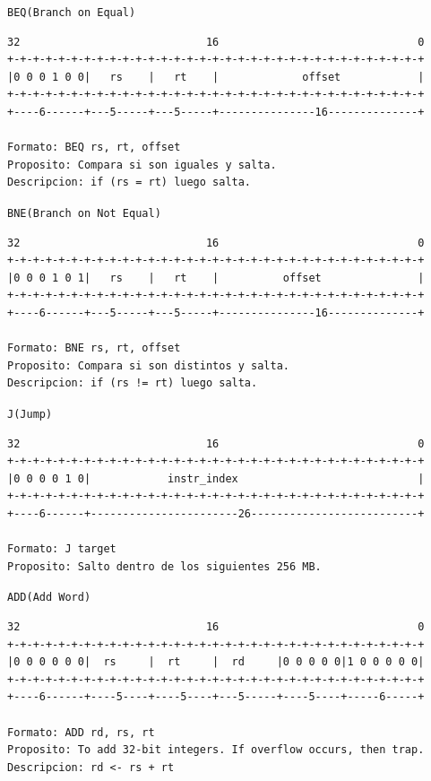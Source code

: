 \texttt{BEQ(Branch on Equal)}

\begin{lstlisting}[style=consola]
32                             16                               0
+-+-+-+-+-+-+-+-+-+-+-+-+-+-+-+-+-+-+-+-+-+-+-+-+-+-+-+-+-+-+-+-+
|0 0 0 1 0 0|   rs    |   rt    |             offset            |
+-+-+-+-+-+-+-+-+-+-+-+-+-+-+-+-+-+-+-+-+-+-+-+-+-+-+-+-+-+-+-+-+
+----6------+---5-----+---5-----+---------------16--------------+

Formato: BEQ rs, rt, offset
Proposito: Compara si son iguales y salta.
Descripcion: if (rs = rt) luego salta.
\end{lstlisting}

\texttt{BNE(Branch on Not Equal)}

\begin{lstlisting}[style=consola]
32                             16                               0
+-+-+-+-+-+-+-+-+-+-+-+-+-+-+-+-+-+-+-+-+-+-+-+-+-+-+-+-+-+-+-+-+
|0 0 0 1 0 1|   rs    |   rt    |          offset               |
+-+-+-+-+-+-+-+-+-+-+-+-+-+-+-+-+-+-+-+-+-+-+-+-+-+-+-+-+-+-+-+-+
+----6------+---5-----+---5-----+---------------16--------------+

Formato: BNE rs, rt, offset
Proposito: Compara si son distintos y salta.
Descripcion: if (rs != rt) luego salta.
\end{lstlisting}

\texttt{J(Jump)}

\begin{lstlisting}[style=consola]
32                             16                               0
+-+-+-+-+-+-+-+-+-+-+-+-+-+-+-+-+-+-+-+-+-+-+-+-+-+-+-+-+-+-+-+-+
|0 0 0 0 1 0|            instr_index                            |
+-+-+-+-+-+-+-+-+-+-+-+-+-+-+-+-+-+-+-+-+-+-+-+-+-+-+-+-+-+-+-+-+
+----6------+-----------------------26--------------------------+

Formato: J target
Proposito: Salto dentro de los siguientes 256 MB.
\end{lstlisting}

\texttt{ADD(Add Word)}

\begin{lstlisting}[style=consola]
32                             16                               0
+-+-+-+-+-+-+-+-+-+-+-+-+-+-+-+-+-+-+-+-+-+-+-+-+-+-+-+-+-+-+-+-+
|0 0 0 0 0 0|  rs     |  rt     |  rd     |0 0 0 0 0|1 0 0 0 0 0|
+-+-+-+-+-+-+-+-+-+-+-+-+-+-+-+-+-+-+-+-+-+-+-+-+-+-+-+-+-+-+-+-+
+----6------+----5----+----5----+---5-----+----5----+-----6-----+

Formato: ADD rd, rs, rt
Proposito: To add 32-bit integers. If overflow occurs, then trap.
Descripcion: rd <- rs + rt
\end{lstlisting}

